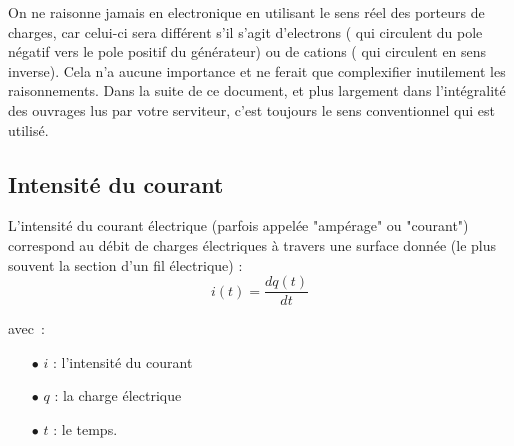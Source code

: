 On ne raisonne jamais en electronique en utilisant le sens réel des porteurs de charges, car celui-ci sera différent s'il s'agit d'electrons ( qui circulent du pole négatif vers le pole positif du générateur) ou de cations ( qui circulent en sens inverse). Cela n'a aucune importance et ne ferait que complexifier inutilement les raisonnements. Dans la suite de ce document, et plus largement dans l'intégralité des ouvrages lus par votre serviteur, c'est toujours le sens conventionnel qui est utilisé.

\subsection*{Intensité du courant}

L'intensité du courant électrique (parfois appelée "ampérage" ou "courant") correspond au débit de charges électriques à travers une surface donnée (le plus souvent la section d'un fil électrique) : \\


	$$ i(t) = \dfrac{dq(t)}{dt} $$

avec~: \\
\begin{itemize}
	\item[$\bullet$] $i$ : l'intensité du courant
	\item[$\bullet$] $q$ : la charge électrique
	\item[$\bullet$] $t$ : le temps.
\end{itemize}


